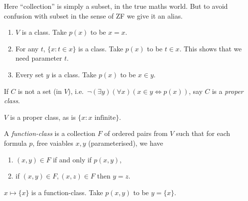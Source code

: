 \documentclass[a4paper]{article}
\begin{document}
Here ``collection'' is simply a subset, in the true maths world. But to avoid confusion with subset in the sense of ZF we give it an alias.

\begin{eg}\leavevmode
  \begin{enumerate}
  \item \(V\) is a class. Take \(p(x)\) to be \(x = x\).
  \item For any \(t\), \(\{x: t \in x\}\) is a class. Take \(p(x)\) to be \(t \in x\). This shows that we need parameter \(t\).
  \item Every set \(y\) is a class. Take \(p(x)\) to be \(x \in y\).
  \end{enumerate}
\end{eg}

\begin{definition}
  If \(C\) is not a set (in \(V\)), i.e.\ \(\neg (\exists y) (\forall x) (x \in y \iff p(x))\), say \(C\) is a \emph{proper class}.
\end{definition}

\begin{eg}
  \(V\) is a proper class, as is \(\{x: x \text{ infinite}\}\).
\end{eg}

\begin{definition}
  A \emph{function-class} is a collection \(F\) of ordered pairs from \(V\) such that for each formula \(p\), free vaiables \(x, y\) (parameterised), we have
  \begin{enumerate}
  \item \((x, y) \in F\) if and only if \(p(x, y)\),
  \item if \((x, y) \in F, (x, z) \in F\) then \(y = z\).
  \end{enumerate}
\end{definition}

\begin{eg}
  \(x \mapsto \{x\}\) is a function-class. Take \(p(x, y)\) to be \(y = \{x\}\).
\end{eg}

\printindex

\iffalse
logic is the interplay of syntax and semantics
set: stuff with sets, universe of sets

Contents

1: Propositional logic
2: Well-ordering and ordinals
3: Posets and Zorn's Lemma
4: Predicate logic
5: Set theory
6: Cardinals

Reading:
Johnstone, Notes on logic and set theory
van Dalen, Logic and structure
Hainal & Hamburger, Set theory
Forster, Logic, induction and sets
\fi
\end{document}
